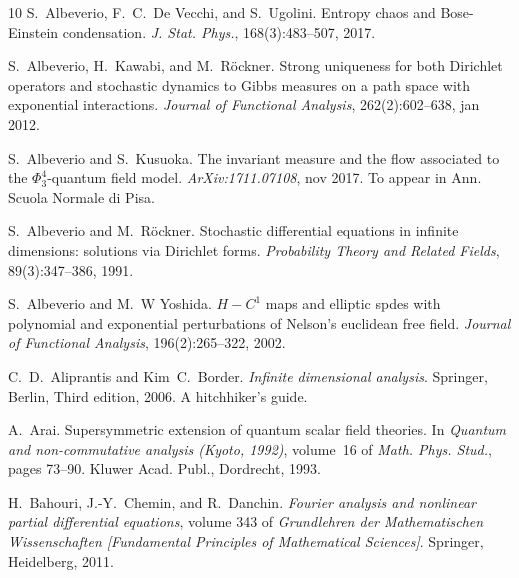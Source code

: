 \documentclass[a4paper,10pt]{article}
\newcommand{\tmtextit}[1]{{\itshape{#1}}}
\begin{document}
\begin{thebibliography}{10}
  S.~Albeverio, F.~C.~De Vecchi, and  S.~Ugolini.
  {\newblock}Entropy chaos and Bose-Einstein condensation.
  {\newblock}\tmtextit{J. Stat. Phys.}, 168(3):483--507, 2017.{\newblock}
  
  S.~Albeverio, H.~Kawabi, and 
  M.~R{\"o}ckner. {\newblock}Strong uniqueness for both Dirichlet operators
  and stochastic dynamics to Gibbs measures on a path space with exponential
  interactions. {\newblock}\tmtextit{Journal of Functional Analysis},
  262(2):602--638, jan 2012.{\newblock}
  
  S.~Albeverio  and  S.~Kusuoka.
  {\newblock}The invariant measure and the flow associated to the
  $\Phi^4_3$-quantum field model. {\newblock}\tmtextit{ArXiv:1711.07108}, nov
  2017. {\newblock}To appear in Ann. Scuola Normale di Pisa.{\newblock}
  
  S.~Albeverio  and  M.~R{\"o}ckner.
  {\newblock}Stochastic differential equations in infinite dimensions:
  solutions via Dirichlet forms. {\newblock}\tmtextit{Probability Theory and
  Related Fields}, 89(3):347--386, 1991.{\newblock}
  
  S.~Albeverio  and  M.~W Yoshida. {\newblock}$H -
  C^1$ maps and elliptic spdes with polynomial and exponential perturbations
  of Nelson's euclidean free field. {\newblock}\tmtextit{Journal of Functional
  Analysis}, 196(2):265--322, 2002.{\newblock}
  
  C.~D.~Aliprantis  and  Kim~C.~Border.
  {\newblock}\tmtextit{Infinite dimensional analysis}. {\newblock}Springer,
  Berlin, Third  edition, 2006. {\newblock}A hitchhiker's guide.{\newblock}
  
  A.~Arai. {\newblock}Supersymmetric
  extension of quantum scalar field theories. {\newblock}In \tmtextit{Quantum
  and non-commutative analysis (Kyoto, 1992)},  volume~16  of \tmtextit{Math.
  Phys. Stud.},  pages  73--90. Kluwer Acad. Publ., Dordrecht,
  1993.{\newblock}
  
  H.~Bahouri, J.-Y.~Chemin, and  R.~Danchin.
  {\newblock}\tmtextit{Fourier analysis and nonlinear partial differential
  equations},  volume  343  of \tmtextit{Grundlehren der Mathematischen
  Wissenschaften [Fundamental Principles of Mathematical Sciences]}.
  {\newblock}Springer, Heidelberg, 2011.{\newblock}
  

\end{thebibliography}
\end{document}
